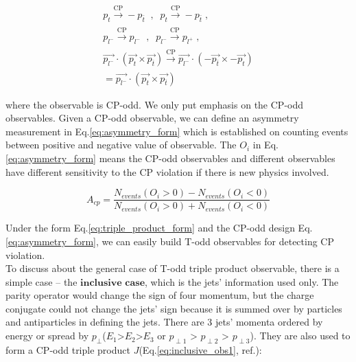 		\begin{equation}
		\begin{split}
		p_{t}\xrightarrow[\text{}]{\text{CP}} -p_{\bar{t}} \; \; , \; \; p_{t}\xrightarrow[\text{}]{\text{CP}} -p_{\bar{t}} \; , \; \; \\
		p_{l^-} \xrightarrow[\text{}]{\text{CP}} p_{l^-} \; \; , \; \; p_{l^-} \xrightarrow[\text{}]{\text{CP}} p_{l^+} \;, \\
		\vec{p_{l^-}} \cdot ( \vec{p_{t}} \times \vec{p_{\overline{t}}} ) \xrightarrow[]{\text{CP}} \vec{p_{l^-}} \cdot ( - \vec{p_{\overline{t}}} \times - \vec{p_{t}} ) \\
		= \vec{p_{l^-}} \cdot ( \vec{p_{t}} \times \vec{p_{\overline{t}}} ) \;\;\;\;\;\;
		\end{split}
		\label{eq:ex_obs_eett}
		\end{equation}
		\FloatBarrier

		where the observable is CP-odd. We only put emphasis on the CP-odd observables. Given a CP-odd observable, we can define an asymmetry measurement in Eq.\ref{eq:asymmetry_form} which is established on counting events between positive and negative value of observable. The $O_i$ in Eq.\ref{eq:asymmetry_form} means the CP-odd observables and different observables have different sensitivity to the CP violation if there is new physics involved.

		\begin{equation}
		A_{cp} = \frac{ N_{events}(O_i>0) - N_{events}(O_i<0) }{ N_{events}(O_i>0) + N_{events}(O_i<0) }
		\label{eq:asymmetry_form}
		\end{equation}
		\FloatBarrier

		Under the form Eq.\ref{eq:triple_product_form} and the CP-odd design Eq.\ref{eq:asymmetry_form}, we can easily build T-odd observables for detecting CP violation. \\
		
		To discuss about the general case of T-odd triple product observable, there is a simple case -- the $\textbf{inclusive case}$, which is the jets' information used only. The parity operator would change the sign of four momentum, but the charge conjugate could not change the jets' sign because it is summed over by particles and antiparticles in defining the jets. There are 3 jets' momenta ordered by energy or spread by $p_{\perp}$($E_1$>$E_2$>$E_3$ or $p_{\perp 1}$ > $p_{\perp 2}$ > $p_{\perp 3}$). They are also used to form a CP-odd triple product $J$(Eq.\ref{eq:inclusive_obs1}, ref.\cite{PhysRevLett.58.451}):

